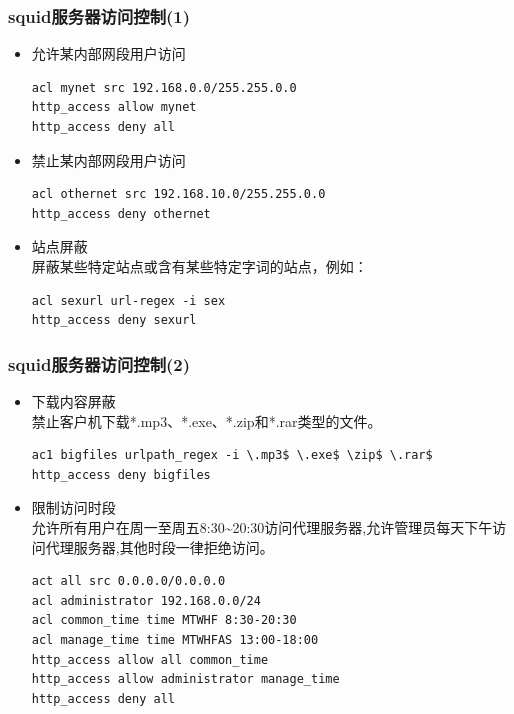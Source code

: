 \documentclass[xcolor=svgnames,presentation]{beamer}
\begin{document}
\begin{frame}[fragile]
\frametitle{squid服务器访问控制(1)}
\label{sec-4-10}
\begin{itemize}

\item 允许某内部网段用户访问\\
\label{sec-4-10-1}%
\begin{verbatim}
acl mynet src 192.168.0.0/255.255.0.0
http_access allow mynet
http_access deny all
\end{verbatim}

\item 禁止某内部网段用户访问\\
\label{sec-4-10-2}%
\begin{verbatim}
acl othernet src 192.168.10.0/255.255.0.0
http_access deny othernet
\end{verbatim}

\item 站点屏蔽\\
\label{sec-4-10-3}%
屏蔽某些特定站点或含有某些特定字词的站点，例如：

\begin{verbatim}
acl sexurl url-regex -i sex
http_access deny sexurl
\end{verbatim}
\end{itemize} %
\end{frame}
\begin{frame}[fragile]
\frametitle{squid服务器访问控制(2)}
\label{sec-4-11}
\begin{itemize}

\item 下载内容屏蔽\\
\label{sec-4-11-1}%
禁止客户机下载*.mp3、*.exe、*.zip和*.rar类型的文件。

\begin{verbatim}
ac1 bigfiles urlpath_regex -i \.mp3$ \.exe$ \zip$ \.rar$
http_access deny bigfiles
\end{verbatim}

\item 限制访问时段\\
\label{sec-4-11-2}%
允许所有用户在周一至周五8:30\~{}20:30访问代理服务器,允许管理员每天下午访问代理服务器,其他时段一律拒绝访问。

\begin{verbatim}
act all src 0.0.0.0/0.0.0.0
acl administrator 192.168.0.0/24
acl common_time time MTWHF 8:30-20:30
acl manage_time time MTWHFAS 13:00-18:00
http_access allow all common_time
http_access allow administrator manage_time
http_access deny all
\end{verbatim}
\end{itemize} %
\end{frame}
\end{document}
